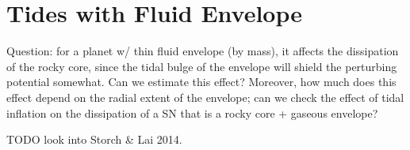 \documentclass[12pt]{article}
\begin{document}
\section{Tides with Fluid Envelope}

Question: for a planet w/ thin fluid envelope (by mass), it affects the
dissipation of the rocky core, since the tidal bulge of the envelope will shield
the perturbing potential somewhat. Can we estimate this effect? Moreover, how
much does this effect depend on the radial extent of the envelope; can we check
the effect of tidal inflation on the dissipation of a SN that is a rocky core +
gaseous envelope?

TODO look into Storch \& Lai 2014.
\end{document}
